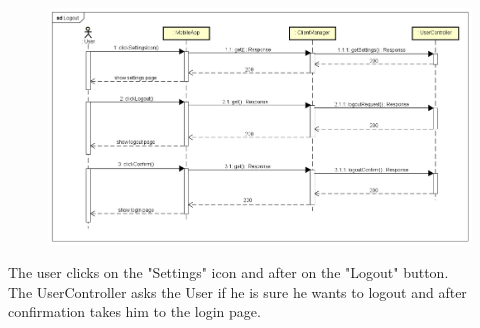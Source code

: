 \begin{figure}[H]
    \begin{center}
        \includegraphics[width=\textwidth]{Images/SequenceDiagrams/LogoutDD.png}
    \end{center}
\end{figure}

The user clicks on the "Settings" icon and after on the "Logout" button. \\
The UserController asks the User if he is sure he wants to logout and after confirmation takes him to the login page.


\newpage

